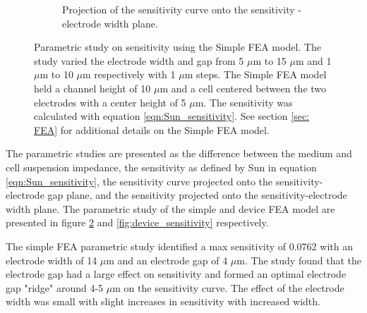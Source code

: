 \begin{figure}[h]
\begin{subfigure}[t]{0.49\textwidth}
        \caption{Projection of the sensitivity curve onto the sensitivity - electrode width plane.}
        \label{fig:simple_sensitivity_width}
    \end{subfigure}
    \caption[Simple FEA model sensitivity]{Parametric study on sensitivity using the Simple FEA model. The study varied the electrode width and gap from 5 $\mu$m to 15 $\mu$m and 1 $\mu$m to 10 $\mu$m respectively with 1 $\mu$m steps. The Simple FEA model held a channel height of 10 $\mu$m and a cell centered between the two electrodes with a center height of 5 $\mu$m. The sensitivity was calculated with equation \ref{eqn:Sun_sensitivity}. See section \ref{sec: FEA} for additional details on the Simple FEA model.} 
    \label{fig:simple_sensitivity}
\end{figure}

\newpage

\par The parametric studies are presented as the difference between the medium and cell suspension impedance, the sensitivity as defined by Sun in equation \ref{eqn:Sun_sensitivity}, the sensitivity curve projected onto the sensitivity-electrode gap plane, and the sensitivity projected onto the sensitivity-electrode width plane. The parametric study of the simple and device FEA model are presented in figure \ref{fig:simple_sensitivity} and \ref{fig:device_sensitivity} respectively.

\par The simple FEA parametric study identified a max sensitivity of 0.0762 with an electrode width of 14 $\mu$m and an electrode gap of 4 $\mu$m. The study found that the electrode gap had a large effect on sensitivity and formed an optimal electrode gap "ridge" around 4-5 $\mu$m on the sensitivity curve. The effect of the electrode width was small with slight increases in sensitivity with increased width.



